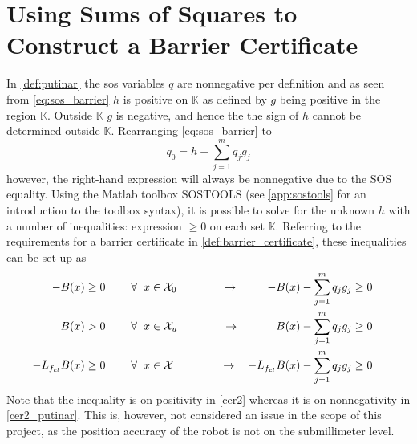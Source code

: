 \section{Using Sums of Squares to Construct a Barrier Certificate}
In \autoref{def:putinar} the \gls{sos} variables $q$ are nonnegative per definition and as seen from \autoref{eq:sos_barrier} $h$ is positive on $\mathbb{K}$ as defined by $g$ being positive in the region $\mathbb{K}$. Outside $\mathbb{K}$ $g$ is negative, and hence the the sign of $h$ cannot be determined outside $\mathbb{K}$.
Rearranging \autoref{eq:sos_barrier} to
\begin{equation}
q_0 = h - \sum _{j=1}^{m}q_jg_j \label{eq:putinar_sos}
\end{equation} 
however, the right-hand expression will always be nonnegative due to the SOS equality. Using the Matlab toolbox SOSTOOLS (see \autoref{app:sostools} for an introduction to the toolbox syntax), it is possible to solve for the unknown $h$ with a number of inequalities: expression $\geq 0$ on each set $\mathbb{K}$. Referring to the requirements for a barrier certificate in \autoref{def:barrier_certificate}, these inequalities can be set up as
\begin{subequations}\label{eq:barrier_constraints_putinar}
\begin{flalign}
	-B(x) &\geq 0 \hspace{0.8cm}  \forall \hspace{2mm} x \in \mathcal{X}_0 \qquad\qquad \rightarrow& 
	-B(x) - \sum _{j=1}^{m}q_jg_j &\geq 0 && \label{cer1_putinar}\\
	B(x) &> 0 \hspace{0.8cm}  \forall \hspace{2mm} x \in \mathcal{X}_u \qquad\qquad \rightarrow& 
	B(x) - \sum _{j=1}^{m}q_jg_j &\geq 0 &&\label{cer2_putinar} \\
	-L_{f_{cl}}B(x) &\geq 0 \hspace{0.8cm}  \forall \hspace{2mm} x \in \mathcal{X} \qquad\qquad\, \rightarrow& 
	-L_{f_{cl}}B(x) - \sum _{j=1}^{m}q_jg_j &\geq 0 && \label{cer3_putinar}
\end{flalign}
\end{subequations}
Note that the inequality is on positivity in \autoref{cer2} whereas it is on nonnegativity in \autoref{cer2_putinar}. This is, however, not considered an issue in the scope of this project, as the position accuracy of the robot is not on the submillimeter level. 

